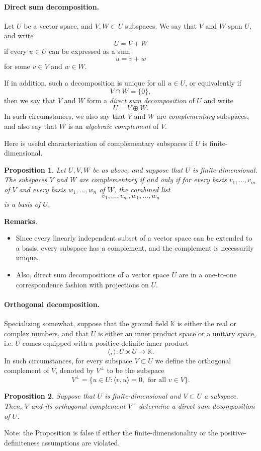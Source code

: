 \documentclass[12pt]{article}
\newtheorem{proposition}{Proposition}
\newcommand{\kf}{\mathbb{K}}
\begin{document}
\paragraph{Direct sum decomposition.}
Let $U$ be a vector space, and $V,W\subset U$ subspaces.  We say that
$V$ and $W$ span $U$, and write
$$U=V+W$$ if
every $u\in U$ can be expressed as a sum
$$u=v+w$$
for some $v\in V$ and $w\in W$.

If in addition, such a decomposition is unique for all $u\in U$, or
equivalently if
$$V\cap W=\{ 0\},$$
then we say that $V$ and $W$ form a \emph{direct sum decomposition} of  $U$
and write
$$U=V\oplus W.$$
In such circumstances, we also say that $V$ and $W$
are \emph{complementary} subspaces, and also say that $W$ is an \emph{algebraic complement} of $V$.

Here is useful  characterization of complementary subspaces if $U$ is
finite-dimensional.
\begin{proposition}
  Let $U, V, W$ be as above, and suppose that $U$ is
  finite-dimensional.  The subspaces $V$ and $W$ are complementary if
  and only if for every basis  $v_1,\ldots, v_m$  of $V$ and
  every basis
  $w_1,\ldots,w_n$  of $W$, the combined list
  $$v_1,\ldots,v_m,w_1,\ldots,w_n$$
  is a basis of $U$.
\end{proposition}

\textbf{Remarks}.
\begin{itemize}
\item
Since every linearly independent subset of a vector space can be extended to a basis, every subspace has a complement, and the complement is necessarily unique.
\item
Also, direct sum decompositions of a vector space $U$ are in a one-to-one correspondence fashion with projections on $U$.
\end{itemize}

\paragraph{Orthogonal decomposition.}
Specializing somewhat, suppose that the ground field $\kf$ is either
the real or complex numbers, and that $U$ is either an inner product
space or a unitary space, i.e. $U$ comes equipped with a
positive-definite inner product
$$\langle,\rangle:U\times U\rightarrow \kf.$$
In such circumstances,
for every subspace $V\subset U$ we define the orthogonal complement of
$V$, denoted by $V^\perp$ to be the subspace
$$V^\perp = \{ u\in U: \langle v,u\rangle = 0,\text{ for all }
v\in V\}.$$
\begin{proposition}
  Suppose that $U$ is finite-dimensional and $V\subset U$ a subspace.
  Then,  $V$ and its orthogonal
  complement $V^\perp$ determine a direct sum decomposition  of $U$.
  \end{proposition}

  Note: the Proposition is false if either the finite-dimensionality
  or the positive-definiteness assumptions are violated.
\end{document}

